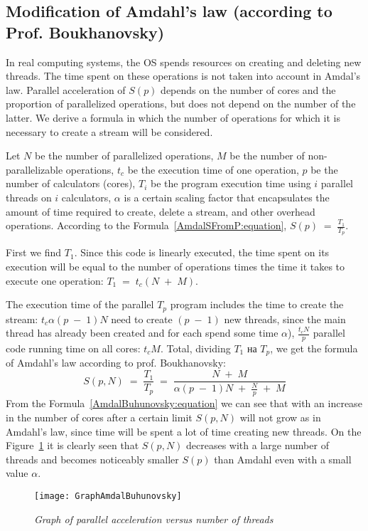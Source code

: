 { %
	\subsection{Modification of Amdahl's law (according to Prof. Boukhanovsky)}
	\par In real computing systems, the OS spends resources on creating and deleting new threads. The time spent on these operations is not taken into account in Amdal's law. Parallel acceleration of $ S (p) $ depends on the number of cores and the proportion of parallelized operations, but does not depend on the number of the latter. We derive a formula in which the number of operations for which it is necessary to create a stream will be considered.
	\par Let $N$ be the number of parallelized operations, $ M $ be the number of non-parallelizable operations,  $t_c$ be the execution time of one operation, $p$ be the number of calculators (cores), $T_i$ be the program execution time using $i$ parallel threads on $i$ calculators, $\alpha$ is a certain scaling factor that encapsulates the amount of time required to create, delete a stream, and other overhead operations.
According to the Formula~\eqref{AmdalSFromP:equation}, $S(p)\;=\;\frac{T_1}{T_p}$.
	\par First we find $ T_1 $. Since this code is linearly executed, the time spent on its execution will be equal to the number of operations times the time it takes to execute one operation: $T_1\;=\;t_c(N\;+\;M)$. 
	\par The execution time of the parallel $T_p$ program includes the time to create the stream: $t_c\alpha(p\;-\;1)N$ need to create $(p\;-\;1)$ new threads, since the main thread has already been created and for each spend some time $\alpha$),  $\frac {t_cN}p$ parallel code running time on all cores: $t_cM$. Total, dividing $T_1$ на $T_p$, we get the formula of Amdahl’s law according to prof. Boukhanovsky:
	\begin{equation}
		\label{AmdalBuhunovsky:equation}
		S(p,N)\;=\;\frac{T_1}{T_p}\;=\;\frac{N\;+\;M}{\alpha(p\;-\;1)N\;+\;\frac Np\;+\;M}
	\end{equation}
From the Formula~\eqref{AmdalBuhunovsky:equation} we can see that with an increase in the number of cores after a certain limit $S(p,N)$ will not grow as in Amdahl’s law, since time will be spent a lot of time creating new threads. On the Figure~\ref{GraphAmdalBuhunovsky:image} it is clearly seen that $S(p,N)$ decreases with a large number of threads and becomes noticeably smaller $S(p)$ than Amdahl even with a small value $\alpha$.
	\begin{figure}[H]
		\texttt{[image: GraphAmdalBuhunovsky]}
		\caption{\textit{Graph of parallel acceleration versus number of threads}}
		\label{GraphAmdalBuhunovsky:image}
	\end{figure}
}